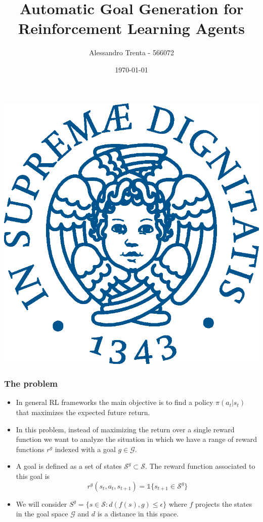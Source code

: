 \documentclass{beamer}
\title[Automatic Goal Generation for RL]{Automatic Goal Generation for Reinforcement Learning Agents} %
\author[Alessandro Trenta]{Alessandro Trenta - 566072} %
\institute[UniPi] %
{ISPR - Dip. of Informatics \\ Università di Pisa %
}
\date{\today} %
\theoremstyle{plain}
\theoremstyle{definition}
\theoremstyle{remark}
\begin{document}
\begin{frame}[plain]
\begin{center}
	\includegraphics[width=0.25\linewidth]{Logo/cherubino_pant541}
\end{center}
\titlepage %
\end{frame}

\begin{frame}
	\frametitle{The problem}
	\begin{itemize}
		\item In general RL frameworks the main  objective is to find a policy $\pi(a_t|s_t)$ that maximizes the expected future return.
		\item In this problem, instead of maximizing the return over a single reward function we want to analyze the situation in which we have a range of reward functions $r^g$ indexed with a goal $g\in\mathcal{G}$.
  		\item A goal is defined as a set of states $\mathcal{S}^{g}\subset \mathcal{S}$. The reward function associated to this goal is
			\begin{equation*}
				r^{g}(s_t, a_t, s_{t+1}) = \mathds{1}\{s_{t+1} \in \mathcal{S}^{g}\}
			\end{equation*}
		\item We will consider $S^{g} = \{s\in \mathcal{S}: d(f(s), g)\leq \epsilon\}$ where $f$ projects the states in the goal space $\mathcal{G}$ and $d$ is a distance in this space.
	\end{itemize}
\end{frame}
\end{document}
